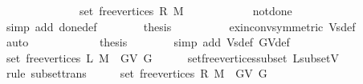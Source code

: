 \begin{isabellebody}
\ \ \ \ \isamarkupfalse%
\ {\isacharminus}{\kern0pt}\isanewline
\ \ \ \ \ \ \isamarkupfalse%
\ {\isachardoublequoteopen}set\ {\isacharparenleft}{\kern0pt}free{\isacharunderscore}{\kern0pt}vertices\ R\ M{\isacharparenright}{\kern0pt}\ {\isasymnoteq}\ {\isacharbraceleft}{\kern0pt}{\isacharbraceright}{\kern0pt}{\isachardoublequoteclose}\isanewline
\ \ \ \ \ \ \ \ \isamarkupfalse%
\ not{\isacharunderscore}{\kern0pt}done{\isacharunderscore}{\kern0pt}{}\isanewline
\ \ \ \ \ \ \ \ \isamarkupfalse%
\ {\isacharparenleft}{\kern0pt}simp\ add{\isacharcolon}{\kern0pt}\ done{\isacharunderscore}{\kern0pt}{}{\isacharunderscore}{\kern0pt}def{\isacharparenright}{\kern0pt}\isanewline
\ \ \ \ \ \ \isamarkupfalse%
\ {\isacharquery}{\kern0pt}thesis\isanewline
\ \ \ \ \ \ \ \ \isamarkupfalse%
\ ex{\isacharunderscore}{\kern0pt}in{\isacharunderscore}{\kern0pt}conv{\isacharbrackleft}{\kern0pt}symmetric{\isacharbrackright}{\kern0pt}\ Vs{\isacharunderscore}{\kern0pt}def\isanewline
\ \ \ \ \ \ \ \ \isamarkupfalse%
\ auto\isanewline
\ \ \ \ \isamarkupfalse%
\isanewline
\ \ \ \ \isamarkupfalse%
\ \isamarkupfalse%
\ {\isacharquery}{\kern0pt}thesis\isanewline
\ \ \ \ \ \ \isamarkupfalse%
\ {\isacharparenleft}{\kern0pt}simp\ add{\isacharcolon}{\kern0pt}\ Vs{\isacharunderscore}{\kern0pt}def\ G{\isachardot}{\kern0pt}V{\isacharunderscore}{\kern0pt}def{\isacharparenright}{\kern0pt}\isanewline
\ \ \isamarkupfalse%
\isanewline
\ \ \isamarkupfalse%
\ \isamarkupfalse%
\ {\isachardoublequoteopen}set\ {\isacharparenleft}{\kern0pt}free{\isacharunderscore}{\kern0pt}vertices\ L\ M{\isacharparenright}{\kern0pt}\ {\isasymsubseteq}\ G{\isachardot}{\kern0pt}V\ G{\isachardoublequoteclose}\isanewline
\ \ \ \ \isamarkupfalse%
\ set{\isacharunderscore}{\kern0pt}free{\isacharunderscore}{\kern0pt}vertices{\isacharunderscore}{\kern0pt}subset\ L{\isacharunderscore}{\kern0pt}subset{\isacharunderscore}{\kern0pt}V\isanewline
\ \ \ \ \isamarkupfalse%
\ {\isacharparenleft}{\kern0pt}rule\ subset{\isacharunderscore}{\kern0pt}trans{\isacharparenright}{\kern0pt}\isanewline
\ \ \isamarkupfalse%
\ \isamarkupfalse%
\ {\isachardoublequoteopen}set\ {\isacharparenleft}{\kern0pt}free{\isacharunderscore}{\kern0pt}vertices\ R\ M{\isacharparenright}{\kern0pt}\ {\isasymsubseteq}\ G{\isachardot}{\kern0pt}V\ G{\isachardoublequoteclose}\isanewline

\end{isabellebody}
